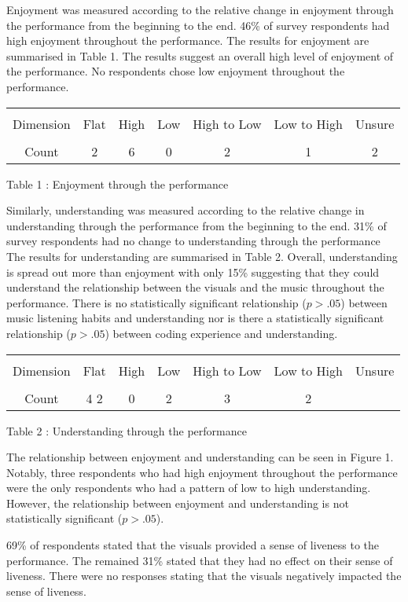 Enjoyment was measured according to the relative change in enjoyment through the performance from the beginning to the end. 46\% of survey respondents had high enjoyment throughout the performance. The results for enjoyment are summarised in Table 1. The results suggest an overall high level of enjoyment of the performance. No respondents chose  low enjoyment throughout the performance.


\begin{tabular}{|c|c|c|c|c|c|c|}
\hline \\
Dimension & Flat & High & Low & High to Low & Low to High & Unsure\\
\hline \\
Count & 2 &6 &0 &2 &1 &2\\
\hline
\end{tabular}
Table 1 : Enjoyment through the performance

Similarly, understanding was measured according to the relative change in understanding through the performance from the beginning to the end. 31\% of survey respondents had no change to understanding through the performance   The results for understanding are summarised in Table 2. Overall, understanding is spread out more than enjoyment with only 15\% suggesting that they could understand the relationship between the visuals and the music throughout the performance. There is no statistically significant relationship ($p > .05$) between music listening habits and understanding nor is there a statistically significant relationship ($p > .05$) between coding experience and understanding.

\begin{tabular}{|c|c|c|c|c|c|c|}
\hline \\
Dimension & Flat & High & Low & High to Low & Low to High & Unsure\\
\hline \\
Count & 4
2&
0&
2&
3&
2 \\
\hline
\end{tabular}
Table 2 : Understanding through the performance

The relationship between enjoyment and understanding can be seen in Figure 1. Notably, three respondents who had high enjoyment throughout the performance were the only respondents who had a pattern of low to high understanding. However, the relationship between enjoyment and understanding is not statistically significant ($p > .05$).

69\% of respondents stated that the visuals provided a sense of liveness to the performance. The remained 31\% stated that they had no effect on their sense of liveness. There were no responses stating that the visuals negatively impacted the sense of liveness. 

